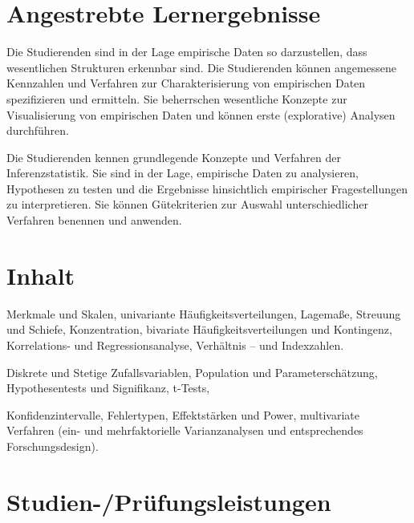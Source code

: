 \section*{Angestrebte
Lernergebnisse\label{/mi-2017/modulbeschreibungen-master/MA_HCI_Modul_Statistical_Methods_for_HCI}}\label{angestrebte-lernergebnissepathlabelmi-2017modulbeschreibungen-mastermaux5fhciux5fmodulux5fstatisticalux5fmethodsux5fforux5fhci}

Die Studierenden sind in der Lage empirische Daten so darzustellen, dass
wesentlichen Strukturen erkennbar sind. Die Studierenden können
angemessene Kennzahlen und Verfahren zur Charakterisierung von
empirischen Daten spezifizieren und ermitteln. Sie beherrschen
wesentliche Konzepte zur Visualisierung von empirischen Daten und können
erste (explorative) Analysen durchführen.

Die Studierenden kennen grundlegende Konzepte und Verfahren der
Inferenzstatistik. Sie sind in der Lage, empirische Daten zu
analysieren, Hypothesen zu testen und die Ergebnisse hinsichtlich
empirischer Fragestellungen zu interpretieren. Sie können Gütekriterien
zur Auswahl unterschiedlicher Verfahren benennen und anwenden.

\section*{Inhalt\label{/mi-2017/modulbeschreibungen-master/MA_HCI_Modul_Statistical_Methods_for_HCI}}\label{inhaltpathlabelmi-2017modulbeschreibungen-mastermaux5fhciux5fmodulux5fstatisticalux5fmethodsux5fforux5fhci}

Merkmale und Skalen, univariante Häufigkeitsverteilungen, Lagemaße,
Streuung und Schiefe, Konzentration, bivariate Häufigkeitsverteilungen
und Kontingenz, Korrelations- und Regressionsanalyse, Verhältnis -- und
Indexzahlen.

Diskrete und Stetige Zufallsvariablen, Population und
Parameterschätzung, Hypothesentests und Signifikanz, t-Tests,

Konfidenzintervalle, Fehlertypen, Effektstärken und Power, multivariate
Verfahren (ein- und mehrfaktorielle Varianzanalysen und entsprechendes
Forschungsdesign).

\section*{Studien-/Prüfungsleistungen\label{/mi-2017/modulbeschreibungen-master/MA_HCI_Modul_Statistical_Methods_for_HCI}}\label{studien-pruxfcfungsleistungenpathlabelmi-2017modulbeschreibungen-mastermaux5fhciux5fmodulux5fstatisticalux5fmethodsux5fforux5fhci}

